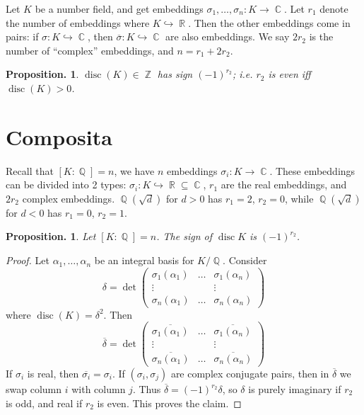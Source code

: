 \documentclass[11pt, a4paper]{memoir}
\DeclareMathOperator{\Q}{{\mathbb{Q}}}
\DeclareMathOperator{\Z}{{\mathbb{Z}}}
\DeclareMathOperator{\R}{{\mathbb{R}}}
\DeclareMathOperator{\C}{{\mathbb{C}}}
\theoremstyle{change}
\newtheorem{proposition}[theorem]{Proposition.}
\theoremstyle{plain}
\theoremstyle{nonumberplain}
\newtheorem{proof}{Proof}
\DeclareMathOperator{\disc}{disc}
\begin{document}
Let $K$ be a number field, and get embeddings $\sigma_1,\ldots,\sigma_n:K\to\C$.
Let $r_1$ denote the number of embeddings where $K\hookrightarrow\R$.
Then the other embeddings come in pairs: if $\sigma:K\hookrightarrow\C$, then $\overline{\sigma}:K\hookrightarrow\C$ are also embeddings.
We say $2r_2$ is the number of ``complex'' embeddings, and $n=r_1+2r_2$.
\begin{proposition}
    $\disc(K)\in\Z$ has sign $(-1)^{r_2}$; i.e. $r_2$ is even iff $\disc(K)>0$.
\end{proposition}
\section{Composita}
Recall that $[K:\Q]=n$, we have $n$ embeddings $\sigma_i:K\to\C$.
These embeddings can be divided into 2 types: $\sigma_i:K\hookrightarrow\R\subseteq \C$, $r_1$ are the real embeddings, and $2r_2$ complex embeddings.
$\Q(\sqrt{d})$ for $d>0$ has $r_1=2$, $r_2=0$, while $\Q(\sqrt{d})$ for $d<0$ has $r_1=0$, $r_2=1$.
\begin{proposition}
    Let $[K:\Q]=n$.
    The sign of $\disc K$ is $(-1)^{r_2}$.
\end{proposition}
\begin{proof}
    Let $\alpha_1,\ldots,\alpha_n$ be an integral basis for $K/\Q$.
    Consider
    \begin{equation*}
        \delta=\det
        \begin{pmatrix}
            \sigma_1(\alpha_1)&\hdots&\sigma_1(\alpha_n)\\
            \vdots&&\vdots\\
            \sigma_n(\alpha_1)&\hdots&\sigma_n(\alpha_n)
        \end{pmatrix}
    \end{equation*}
    where $\disc(K)=\delta^2$.
    Then
    \begin{equation*}
        \overline{\delta}=\det
        \begin{pmatrix}
            \overline{\sigma_1(\alpha_1)}&\hdots&\overline{\sigma_1(\alpha_n)}\\
            \vdots&&\vdots\\
            \overline{\sigma_n(\alpha_1)}&\hdots&\overline{\sigma_n(\alpha_n)}
        \end{pmatrix}
    \end{equation*}
    If $\sigma_i$ is real, then $\overline{\sigma_i}=\sigma_i$.
    If $(\sigma_i,\sigma_j)$ are complex conjugate pairs, then in $\overline{\delta}$ we swap column $i$ with column $j$.
    Thus $\overline{\delta}=(-1)^{r_2}\delta$, so $\delta$ is purely imaginary if $r_2$ is odd, and real if $r_2$ is even.
    This proves the claim.
\end{proof}
\end{document}
